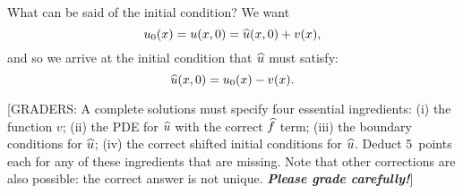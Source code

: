 {\begin{solution}
What can be said of the initial condition? We want
\[ u_0(x) = u(x,0) = \widehat{u}(x,0) + v(x),\]
and so we arrive at the initial condition that $\widehat{u}$ must satisfy:
\[ \widehat{u}(x,0) = u_0(x)-v(x).\]

[GRADERS: A complete solutions must specify four essential ingredients:
(i) the function $v$; (ii) the PDE for $\widehat{u}$ with the correct $\widehat{f}$ term;
(iii) the boundary conditions for $\widehat{u}$; (iv) the correct shifted initial
conditions for $\widehat{u}$.  Deduct 5~points each for any of these ingredients
that are missing.  Note that other corrections are also possible: the correct
answer is not unique.  \textbf{\emph{Please grade carefully!}}]
\end{solution}}{}

